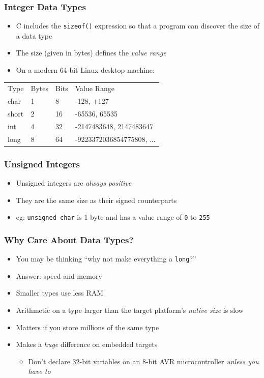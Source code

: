 \documentclass[14pt]{beamer}
\begin{document}
\begin{frame}
\frametitle{Integer Data Types}
\begin{itemize}
\item C includes the \texttt{sizeof()} expression so that a program can discover the size of a data type
\item The size (given in bytes) defines the \textit{value range}
\item On a modern 64-bit Linux desktop machine:
\end{itemize}
\begin{table}[]
\begin{tabular}{llll}
Type & Bytes & Bits & Value Range                               \\
char      & 1            & 8           & -128, +127                                \\
short     & 2            & 16          & -65536, 65535                             \\
int       & 4            & 32          & -2147483648, 2147483647                   \\
long      & 8            & 64          & -9223372036854775808, ...
\end{tabular}
\end{table}
\end{frame}

\begin{frame}
\frametitle{Unsigned Integers}
\begin{itemize}
\item Unsigned integers are \textit{always positive}
\item They are the same size as their signed counterparts
\item eg: \texttt{unsigned char} is 1 byte and has a value range of \texttt{0} to \texttt{255}
\end{itemize}
\end{frame}

\begin{frame}
\frametitle{Why Care About Data Types?}
\begin{itemize}
\item You may be thinking ``why not make everything a \texttt{long}?''
\item Answer: speed and memory
\item Smaller types use less RAM
\item Arithmetic on a type larger than the target platform's \textit{native size} is slow
\item Matters if you store millions of the same type
\item Makes a \textit{huge} difference on embedded targets
\begin{itemize}
	\item Don't declare 32-bit variables on an 8-bit AVR microcontroller \textit{unless you have to}
\end{itemize}
\end{itemize}
\end{frame}
\end{document}
